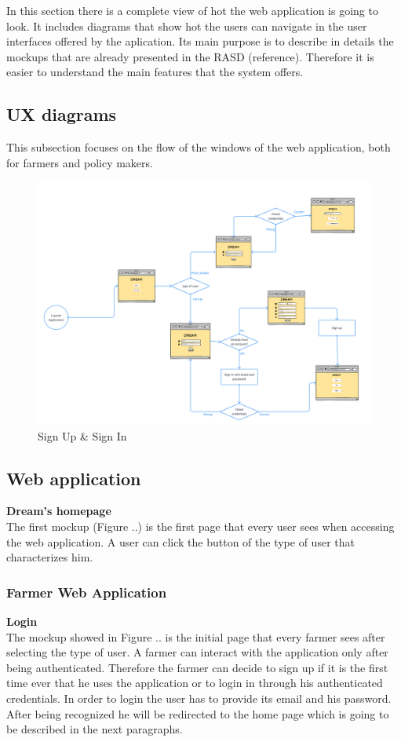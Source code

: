 In this section there is a complete view of hot the web application is going to look. 
It includes diagrams that show hot the users can navigate in the user interfaces offered by the aplication.
Its main purpose is to describe in details the mockups that are already presented in the RASD (reference). Therefore it is easier to understand 
the main features that the system offers.


\subsection{UX diagrams}
This subsection focuses on the flow of the windows of the web application, 
both for farmers and policy makers.

\begin{figure}[H]
    \begin{center}
          \includegraphics[width=1\textwidth]{images/UXdiagram_login.png}
          \caption{Sign Up \& Sign In}
    \end{center}
\end{figure}

\subsection{Web application}
\textbf{Dream's homepage} \\
The first mockup (Figure ..) is the first page that every user sees when accessing the web application. 
A user can click the button of the type of user that characterizes him.

\subsubsection{Farmer Web Application}
\textbf{Login}\\ 
The mockup showed in Figure .. is the initial page that every farmer sees after selecting the type of user. A  farmer can interact with the application only 
after being authenticated. Therefore the farmer can decide to sign up if it is the first time ever that he uses the application or to login in through his authenticated credentials.
In order to login the user has to provide its email and his password. After being recognized he will be redirected to the home page which is going to be described in the next paragraphs.

